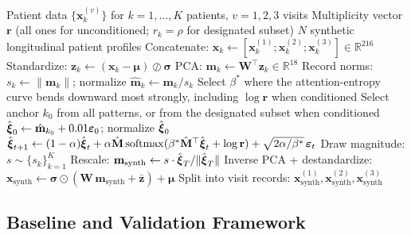 \begin{algorithm}[ht]
\caption{Multiplicity-Weighted SA for Longitudinal Patient Generation}
\label{alg:sa-pipeline}
\begin{algorithmic}[1]
\Require Patient data $\{\mathbf{x}_k^{(v)}\}$ for $k=1,\ldots,K$ patients, $v=1,2,3$ visits
\Require Multiplicity vector $\mathbf{r}$ (all ones for unconditioned; $r_k = \rho$ for designated subset)
\Ensure $N$ synthetic longitudinal patient profiles
\State Concatenate: $\mathbf{x}_k \gets [\mathbf{x}_k^{(1)}; \mathbf{x}_k^{(2)}; \mathbf{x}_k^{(3)}] \in \mathbb{R}^{216}$
\State Standardize: $\mathbf{z}_k \gets (\mathbf{x}_k - \boldsymbol{\mu}) \oslash \boldsymbol{\sigma}$
\State PCA: $\mathbf{m}_k \gets \mathbf{W}^\top \mathbf{z}_k \in \mathbb{R}^{18}$ 
\State Record norms: $s_k \gets \|\mathbf{m}_k\|$; normalize $\hat{\mathbf{m}}_k \gets \mathbf{m}_k / s_k$
\State Select $\beta^*$ where the attention-entropy curve bends downward most strongly, including $\log\mathbf{r}$ when conditioned
    \State Select anchor $k_0$ from all patterns, or from the designated subset when conditioned
    \State $\hat{\boldsymbol{\xi}}_0 \gets \hat{\mathbf{m}}_{k_0}+0.01\boldsymbol{\varepsilon}_0$; normalize $\hat{\boldsymbol{\xi}}_0$
     
        \State $\hat{\boldsymbol{\xi}}_{t+1} \gets (1-\alpha)\hat{\boldsymbol{\xi}}_t + \alpha\hat{\mathbf{M}}\,\mathrm{softmax}(\beta^*\hat{\mathbf{M}}^\top\hat{\boldsymbol{\xi}}_t + \log\mathbf{r}) + \sqrt{2\alpha/\beta^*}\,\boldsymbol{\varepsilon}_t$
    \EndFor
    \State Draw magnitude: $s \sim \{s_k\}_{k=1}^K$
    \State Rescale: $\mathbf{m}_{\text{synth}} \gets s \cdot \hat{\boldsymbol{\xi}}_T / \|\hat{\boldsymbol{\xi}}_T\|$
    \State Inverse PCA + destandardize: $\mathbf{x}_{\text{synth}} \gets \boldsymbol{\sigma} \odot (\mathbf{W}\,\mathbf{m}_{\text{synth}} + \bar{\mathbf{z}}) + \boldsymbol{\mu}$
    \State Split into visit records: $\mathbf{x}_{\text{synth}}^{(1)}, \mathbf{x}_{\text{synth}}^{(2)}, \mathbf{x}_{\text{synth}}^{(3)}$
\EndFor
\end{algorithmic}
\end{algorithm}

\subsection{Baseline and Validation Framework}
\label{sec:validation}


